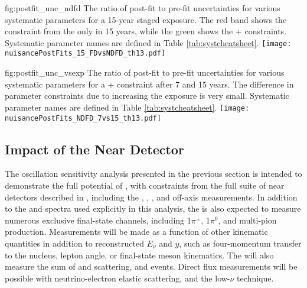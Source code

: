 \begin{dunefigure}{fig:postfit_unc_ndfd}
{The ratio of post-fit to pre-fit uncertainties for various systematic parameters for a 15-year staged exposure. The red band shows the constraint from the  only in 15 years, while the green shows the + constraints. Systematic parameter names are defined in Table \ref{tab:systcheatsheet}.}
  \texttt{[image: nuisancePostFits\_15\_FDvsNDFD\_th13.pdf]}
\end{dunefigure}

\begin{dunefigure}{fig:postfit_unc_vsexp}
{The ratio of post-fit to pre-fit uncertainties for various systematic parameters for a + constraint after 7 and 15 years. The difference in parameter constraints due to increasing the exposure is very small. Systematic parameter names are defined in Table \ref{tab:systcheatsheet}.}
  \texttt{[image: nuisancePostFits\_NDFD\_7vs15\_th13.pdf]}
\end{dunefigure}




\subsection{Impact of the Near Detector}
\label{sec:ndimpact}

The oscillation sensitivity analysis presented in the previous section is intended to demonstrate the full potential of , with constraints from the full suite of near detectors described in \introchnd, including the  , , , and off-axis measurements. In addition to the \numu and \anumu {} spectra used explicitly in this analysis, the   is also expected to measure numerous exclusive final-state  channels, including 1$\pi^{\pm}$, 1$\pi^0$, and multi-pion production. Measurements will be made as a function of other kinematic quantities in addition to reconstructed $E_{\nu}$ and $y$, such as four-momentum transfer to the nucleus, lepton angle, or final-state meson kinematics. The   will also measure the sum of \nue and \anue {} scattering, and  events. Direct flux measurements will be possible with neutrino-electron elastic scattering, and the low-$\nu$ technique.

